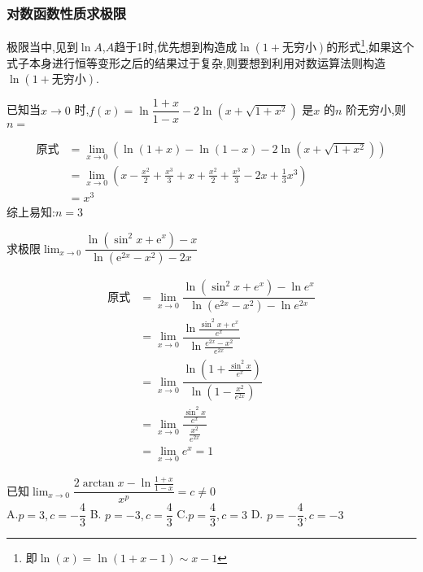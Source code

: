 \documentclass[8pt a4paper, oneside, UTF8]{ctexbook}
\begin{document}
\begin{sloppypar}
    \subsubsection{对数函数性质求极限}
    极限当中,见到$\ln A$,$A$趋于1时,优先想到构造成$\ln(1+\text{无穷小})$的形式\footnote{即$\ln(x)=\ln(1+x-1)\sim x-1$},如果这个式子本身进行恒等变形之后的结果过于复杂,则要想到利用对数运算法则构造 $\ln(1+\text{无穷小})$.
    \begin{problem}
    已知当$x\to0$ 时,$f(x)=\ln\dfrac{1+x}{1-x}-2\ln(x+\sqrt{1+x^2})$ 是$x$ 的$n$ 阶无穷小,则$n=$
    \end{problem}
    \begin{solution}
        \begin{align*}
            \text{原式} & =\lim_{x\to 0} (\ln(1+x)-\ln(1-x)-2\ln(x+\sqrt{1+x^2}))                                         \\
                      & =  \lim_{x\to0} (x-\frac{x^2}{2}+\frac{x^3}{3}+x+\frac{x^2}{2}+\frac{x^3}{3}-2x+\frac{1}{3}x^3) \\
                      & = x^3
        \end{align*}
        综上易知:$n=3$
    \end{solution}
    \begin{problem}
    求极限$\lim_{x\to0}\dfrac{\ln(\sin^2x+\mathrm{e}^x)-x}{\ln(\mathrm{e}^{2x}-x^2)-2x}$
    \end{problem}
    \begin{solution}
        \begin{align*}
            \text{原式} & = \lim_{x\to0}\dfrac{\ln(\sin^2 x+e^x)-\ln e^x}{\ln(\mathrm{e}^{2x}-x^2)-\ln e^{2x}} \\
                      & =\lim_{x\to0} \dfrac{\ln \frac{\sin^2 x+e^x}{e^x}}{\ln\frac{e^{2x}-x^2}{e^{2x}}}     \\
                      & = \lim_{x \to 0} \dfrac{\ln (1+\frac{\sin ^2 x}{e^x})}{\ln (1-\frac{x^2}{e^{2x}})}   \\
                      & =\lim_{x \to 0} \dfrac{\frac{\sin^2 x}{e^x}}{\frac{x^2}{e^{2x}}}                     \\
                      & =\lim_{x \to 0} e^x=1
        \end{align*}
    \end{solution}
    \begin{problem}
    已知$\lim_{x\to 0}\dfrac{2\arctan x-\ln\frac{1+x}{1-x}}{x^p}=c \neq 0$\\
    A.$p=3,c=-\dfrac43$ \qquad B. $p=-3,c=\dfrac{4}{3}$ \qquad C.$p=\dfrac{4}{3},c=3$ \qquad D. $p= - \dfrac 43,c= - 3$

\end{problem}
\end{sloppypar}
\end{document}
